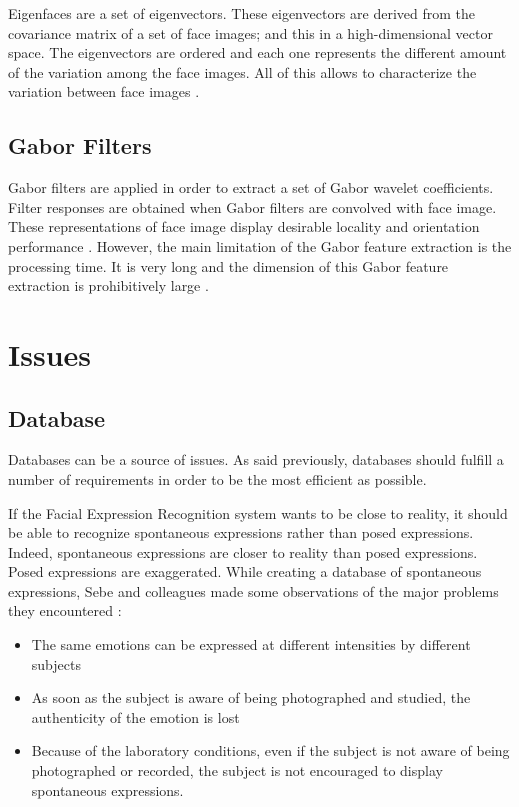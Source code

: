 \vspace{\baselineskip}
\noindent Eigenfaces are a set of eigenvectors. These eigenvectors are derived from the covariance matrix of a set of face images; and this in a high-dimensional vector space. The eigenvectors are ordered and each one represents the different amount of the variation among the face images. All of this allows to characterize the variation between face images \cite{TUR91}.
\newline

\subsection{Gabor Filters}

\vspace{\baselineskip}
\noindent Gabor filters are applied in order to extract a set of Gabor wavelet coefficients. Filter responses are obtained when Gabor filters are convolved with face image. These representations of face image display desirable locality and orientation performance \cite{JEM09}. However, the main limitation of the Gabor feature extraction is the processing time. It is very long and the dimension of this Gabor feature extraction is prohibitively large \cite{PRA09}.
\newline

\section{Issues}

\vspace{\baselineskip}
\subsection{Database}

\vspace{\baselineskip}
\noindent Databases can be a source of issues. As said previously, databases should fulfill a number of requirements in order to be the most efficient as possible. 
\newline

\noindent If the Facial Expression Recognition system wants to be close to reality, it should be able to recognize spontaneous expressions rather than posed expressions. Indeed, spontaneous expressions are closer to reality than posed expressions. Posed expressions are exaggerated. While creating a database of spontaneous expressions, Sebe and colleagues \cite{SEB07} made some observations of the major problems they encountered \cite{BET12}:
\newline
\begin{itemize}
  \item The same emotions can be expressed at different intensities by different subjects
  \item As soon as the subject is aware of being photographed and studied, the authenticity of the emotion is lost
  \item Because of the laboratory conditions, even if the subject is not aware of being photographed or recorded, the subject is not encouraged to display spontaneous expressions.
\end{itemize}

